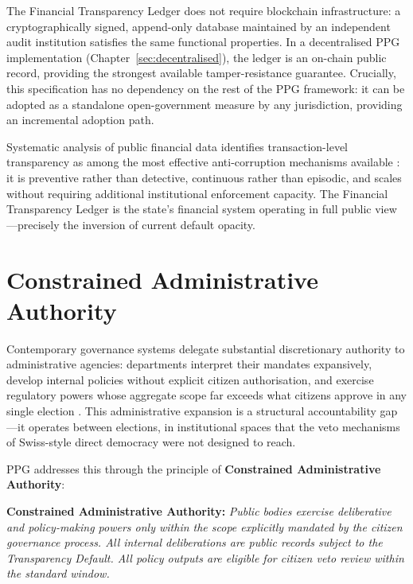 \documentclass[12pt,a4paper,oneside]{report}
\begin{document}
The Financial Transparency Ledger does not require blockchain infrastructure: a cryptographically signed, append-only database maintained by an independent audit institution satisfies the same functional properties. In a decentralised PPG implementation (Chapter~\ref{sec:decentralised}), the ledger is an on-chain public record, providing the strongest available tamper-resistance guarantee. Crucially, this specification has no dependency on the rest of the PPG framework: it can be adopted as a standalone open-government measure by any jurisdiction, providing an incremental adoption path.

Systematic analysis of public financial data identifies transaction-level transparency as among the most effective anti-corruption mechanisms available \citep{oecd2020open}: it is preventive rather than detective, continuous rather than episodic, and scales without requiring additional institutional enforcement capacity. The Financial Transparency Ledger is the state's financial system operating in full public view---precisely the inversion of current default opacity.

\section{Constrained Administrative Authority}
\label{sec:constrained}

Contemporary governance systems delegate substantial discretionary authority to administrative agencies: departments interpret their mandates expansively, develop internal policies without explicit citizen authorisation, and exercise regulatory powers whose aggregate scope far exceeds what citizens approve in any single election \citep{norris2011democratic}. This administrative expansion is a structural accountability gap---it operates between elections, in institutional spaces that the veto mechanisms of Swiss-style direct democracy were not designed to reach.

PPG addresses this through the principle of \textbf{Constrained Administrative Authority}:

\begin{mdframed}
\textbf{Constrained Administrative Authority:} \textit{Public bodies exercise deliberative and policy-making powers only within the scope explicitly mandated by the citizen governance process. All internal deliberations are public records subject to the Transparency Default. All policy outputs are eligible for citizen veto review within the standard window.}
\end{mdframed}
\end{document}
